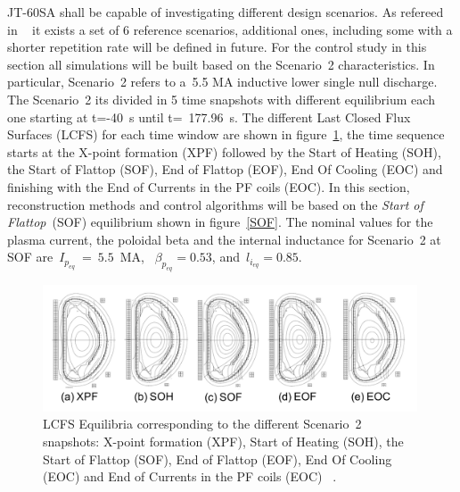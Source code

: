 JT-60SA shall be capable of investigating different design scenarios. As refereed  in 
~\cite{JT60SA:PID} it exists a set of 6 reference scenarios, additional ones, including some with a shorter repetition rate will be defined in future. For the control study in this section all simulations will be built based on the Scenario~2 characteristics. In particular, Scenario~2 refers to a~5.5 MA inductive lower single null discharge. The Scenario~2 its divided in 5 time snapshots with different equilibrium each one starting at  t=-40~s until t=~177.96~s. The different Last Closed Flux Surfaces (LCFS) for each time window are shown in figure~\ref{Scen2}, the time sequence starts at the X-point formation (XPF)	followed by the Start of Heating (SOH), the Start of Flattop (SOF), End of Flattop (EOF), End Of Cooling (EOC) and finishing with the End of Currents in the PF coils (EOC). In this section, reconstruction methods and control algorithms will be based on the \emph{Start of Flattop}~(SOF) equilibrium shown in figure~\ref{SOF}. The nominal values for the plasma current, the poloidal beta and the internal inductance for Scenario~2 at SOF are~$I_{p_{eq}}~=~5.5$~MA,~ $\beta_{p_{eq}}=0.53$, and~$l_{i_{eq}}=0.85$.\smallskip

\begin{figure}[h]
	\centering
	\includegraphics[width=0.99\textwidth]{Chp3/scenario2SnapShots.png}
	
	\caption{LCFS Equilibria corresponding to the different Scenario~2 snapshots:  X-point formation (XPF), Start of Heating (SOH), the Start of Flattop (SOF), End of Flattop (EOF), End Of Cooling (EOC) and  End of Currents in the PF coils (EOC) ~\cite{JT60SA:PID}. \label{Scen2}}
\end{figure}


